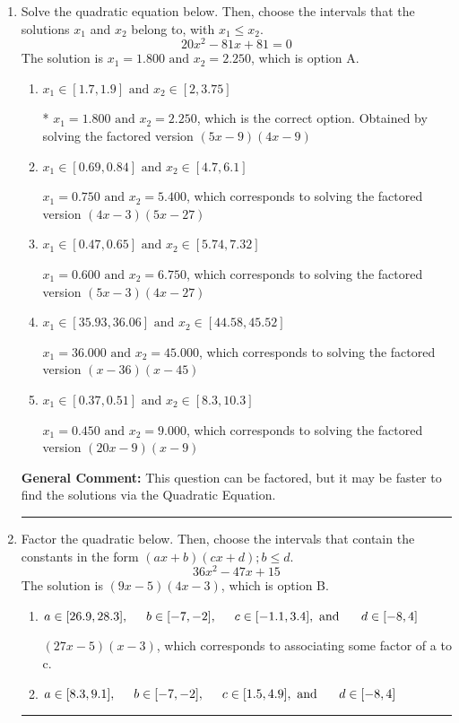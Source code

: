 \documentclass{extbook}[14pt]
\newcommand{\litem}[1]{\item #1

\rule{\textwidth}{0.4pt}}
\begin{document}
\begin{enumerate}\litem{
Solve the quadratic equation below. Then, choose the intervals that the solutions $x_1$ and $x_2$ belong to, with $x_1 \leq x_2$.
\[ 20x^{2} -81 x + 81 = 0 \]The solution is \( x_1 = 1.800 \text{ and } x_2 = 2.250 \), which is option A.\begin{enumerate}[label=\Alph*.]
\item \( x_1 \in [1.7, 1.9] \text{ and } x_2 \in [2, 3.75] \)

* $x_1 = 1.800 \text{ and } x_2 = 2.250$, which is the correct option. Obtained by solving the factored version $(5x -9)(4x -9)$
\item \( x_1 \in [0.69, 0.84] \text{ and } x_2 \in [4.7, 6.1] \)

$x_1 = 0.750 \text{ and } x_2 = 5.400$, which corresponds to solving the factored version $(4x -3)(5x -27)$
\item \( x_1 \in [0.47, 0.65] \text{ and } x_2 \in [5.74, 7.32] \)

$x_1 = 0.600 \text{ and } x_2 = 6.750$, which corresponds to solving the factored version $(5x -3)(4x -27)$
\item \( x_1 \in [35.93, 36.06] \text{ and } x_2 \in [44.58, 45.52] \)

$x_1 = 36.000 \text{ and } x_2 = 45.000$, which corresponds to solving the factored version $(x -36)(x -45)$
\item \( x_1 \in [0.37, 0.51] \text{ and } x_2 \in [8.3, 10.3] \)

$x_1 = 0.450 \text{ and } x_2 = 9.000$, which corresponds to solving the factored version $(20x -9)(x -9)$
\end{enumerate}

\textbf{General Comment:} This question can be factored, but it may be faster to find the solutions via the Quadratic Equation.
}
\litem{
Factor the quadratic below. Then, choose the intervals that contain the constants in the form $(ax+b)(cx+d); b \leq d.$
\[ 36x^{2} -47 x + 15 \]The solution is \( (9x -5)(4x -3) \), which is option B.\begin{enumerate}[label=\Alph*.]
\item \( a \in [26.9, 28.3], \hspace*{5mm} b \in [-7, -2], \hspace*{5mm} c \in [-1.1, 3.4], \text{ and } \hspace*{5mm} d \in [-8, 4] \)

 $(27x -5)(x -3)$, which corresponds to associating some factor of a to c.
\item \( a \in [8.3, 9.1], \hspace*{5mm} b \in [-7, -2], \hspace*{5mm} c \in [1.5, 4.9], \text{ and } \hspace*{5mm} d \in [-8, 4] \)


\end{enumerate}}
\end{enumerate}
\end{document}
